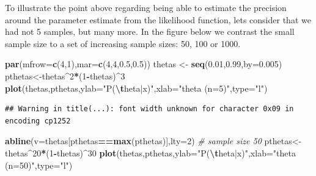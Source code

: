 \documentclass[
]{book}
\newenvironment{Shaded}{\begin{snugshade}}{\end{snugshade}}
\newcommand{\AttributeTok}[1]{\textcolor[rgb]{0.13,0.29,0.53}{#1}}
\newcommand{\CommentTok}[1]{\textcolor[rgb]{0.56,0.35,0.01}{\textit{#1}}}
\newcommand{\DecValTok}[1]{\textcolor[rgb]{0.00,0.00,0.81}{#1}}
\newcommand{\FloatTok}[1]{\textcolor[rgb]{0.00,0.00,0.81}{#1}}
\newcommand{\FunctionTok}[1]{\textcolor[rgb]{0.13,0.29,0.53}{\textbf{#1}}}
\newcommand{\NormalTok}[1]{#1}
\newcommand{\OtherTok}[1]{\textcolor[rgb]{0.56,0.35,0.01}{#1}}
\newcommand{\SpecialCharTok}[1]{\textcolor[rgb]{0.81,0.36,0.00}{\textbf{#1}}}
\newcommand{\StringTok}[1]{\textcolor[rgb]{0.31,0.60,0.02}{#1}}
\begin{document}
To illustrate the point above regarding being able to estimate the precision around the parameter estimate from the likelihood function, lets consider that we had not 5 samples, but many more. In the figure below we contrast the small sample size to a set of increasing sample sizes: 50, 100 or 1000.

\begin{Shaded}
\begin{Highlighting}[]
\FunctionTok{par}\NormalTok{(}\AttributeTok{mfrow=}\FunctionTok{c}\NormalTok{(}\DecValTok{4}\NormalTok{,}\DecValTok{1}\NormalTok{),}\AttributeTok{mar=}\FunctionTok{c}\NormalTok{(}\DecValTok{4}\NormalTok{,}\DecValTok{4}\NormalTok{,}\FloatTok{0.5}\NormalTok{,}\FloatTok{0.5}\NormalTok{))}
\NormalTok{thetas }\OtherTok{\textless{}{-}} \FunctionTok{seq}\NormalTok{(}\FloatTok{0.01}\NormalTok{,}\FloatTok{0.99}\NormalTok{,}\AttributeTok{by=}\FloatTok{0.005}\NormalTok{)}
\NormalTok{pthetas}\OtherTok{\textless{}{-}}\NormalTok{thetas}\SpecialCharTok{\^{}}\DecValTok{2}\SpecialCharTok{*}\NormalTok{(}\DecValTok{1}\SpecialCharTok{{-}}\NormalTok{thetas)}\SpecialCharTok{\^{}}\DecValTok{3}
\FunctionTok{plot}\NormalTok{(thetas,pthetas,}\AttributeTok{ylab=}\StringTok{"P(}\SpecialCharTok{\textbackslash{}t}\StringTok{heta|x)"}\NormalTok{,}\AttributeTok{xlab=}\StringTok{"theta (n=5)"}\NormalTok{,}\AttributeTok{type=}\StringTok{"l"}\NormalTok{)}
\end{Highlighting}
\end{Shaded}

\begin{verbatim}
## Warning in title(...): font width unknown for character 0x09 in encoding cp1252
\end{verbatim}

\begin{Shaded}
\begin{Highlighting}[]
\FunctionTok{abline}\NormalTok{(}\AttributeTok{v=}\NormalTok{thetas[pthetas}\SpecialCharTok{==}\FunctionTok{max}\NormalTok{(pthetas)],}\AttributeTok{lty=}\DecValTok{2}\NormalTok{)}
\CommentTok{\# sample size 50}
\NormalTok{pthetas}\OtherTok{\textless{}{-}}\NormalTok{thetas}\SpecialCharTok{\^{}}\DecValTok{20}\SpecialCharTok{*}\NormalTok{(}\DecValTok{1}\SpecialCharTok{{-}}\NormalTok{thetas)}\SpecialCharTok{\^{}}\DecValTok{30}
\FunctionTok{plot}\NormalTok{(thetas,pthetas,}\AttributeTok{ylab=}\StringTok{"P(}\SpecialCharTok{\textbackslash{}t}\StringTok{heta|x)"}\NormalTok{,}\AttributeTok{xlab=}\StringTok{"theta  (n=50)"}\NormalTok{,}\AttributeTok{type=}\StringTok{"l"}\NormalTok{)}
\end{Highlighting}
\end{Shaded}
\end{document}
